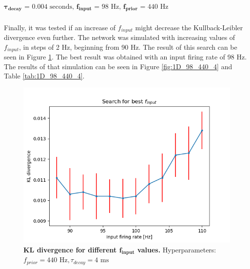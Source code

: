 \subparagraph{$\boldsymbol{\tau_{decay}} \text{ = 0.004 seconds, }\mathbf{f_{input}} \text{ = 98 Hz, }\mathbf{f_{prior}} \text{ = 440 Hz}$}
Finally, it was tested if an increase of $f_{input}$ might decrease the Kullback-Leibler divergence even further. The network was simulated with increasing values of $f_{input}$, in steps of 2 Hz, beginning from 90 Hz. The result of this search can be seen in Figure \ref{fig:1D_KLD_fPrior440_tau4}. The best result was obtained with an input firing rate of 98 Hz. The results of that simulation can be seen in Figure \ref{fig:1D_98_440_4} and Table \ref{tab:1D_98_440_4}.

\begin{figure}
\centering
  \includegraphics[width=0.75\linewidth]{figures/1D/KLDvsfInput_fPrior440tau4.png}
  \caption{\textbf{KL divergence for different $\mathbf{f_{input}}$ values.} Hyperparameters: $f_{prior} = 440\text{ Hz}, \tau_{decay} = 4\text{ ms}$}
  \label{fig:1D_KLD_fPrior440_tau4}
\end{figure}

